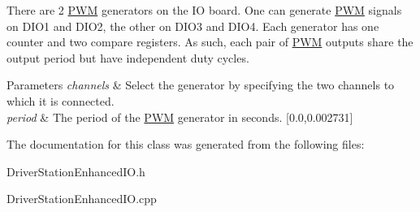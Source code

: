 There are 2 \hyperlink{classPWM}{PWM} generators on the IO board. One can generate \hyperlink{classPWM}{PWM} signals on DIO1 and DIO2, the other on DIO3 and DIO4. Each generator has one counter and two compare registers. As such, each pair of \hyperlink{classPWM}{PWM} outputs share the output period but have independent duty cycles.


\begin{DoxyParams}{Parameters}
{\em channels} & Select the generator by specifying the two channels to which it is connected. \\
\hline
{\em period} & The period of the \hyperlink{classPWM}{PWM} generator in seconds. \mbox{[}0.0,0.002731\mbox{]} \\
\hline
\end{DoxyParams}


The documentation for this class was generated from the following files:\begin{DoxyCompactItemize}
\item 
DriverStationEnhancedIO.h\item 
DriverStationEnhancedIO.cpp\end{DoxyCompactItemize}
